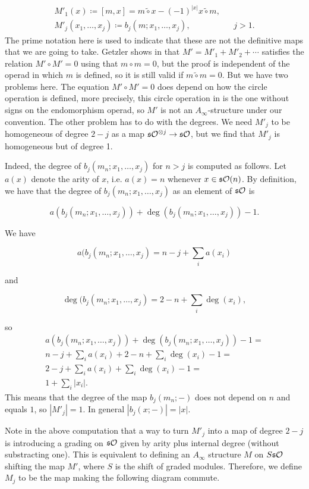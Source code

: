 \documentclass[twoside]{article}
\begin{document}
\begin{align*}
M'_1(x)\coloneqq [m,x]=m\tilde{\circ} x-(-1)^{|x|}x\tilde{\circ}m, & &  \\
M'_j(x_1,\dots, x_j)\coloneqq b_j(m;x_1,\dots, x_j),& &j>1.
\end{align*}
The prime notation here is used to indicate that these are not the definitive maps that we are going to take. Getzler shows in \cite{getzler} that $M'=M'_1+M'_2+\cdots$ satisfies the relation $M'\circ M'=0$ using that $m\circ m=0$, but the proof is independent of the operad in which $m$ is defined, so it is still valid if $m\tilde{\circ}m=0$. But we have two problems here. The equation $M'\circ M'=0$ does depend on how the circle operation is defined, more precisely, this circle operation in \cite{getzler} is the one without signs on the endomorphism operad, so $M'$ is not an $A_\infty$-structure under our convention. The other problem has to do with the degrees. We need $M'_j$ to be homogeneous of degree $2-j$ as a map $\mathfrak{s}{\mathcal O}^{\otimes j}\to \mathfrak{s}{\mathcal O}$, but we find that $M'_j$ is homogeneous but of degree 1. 

Indeed, the degree of $b_j(m_n;x_1,\dots,x_j)$ for $n>j$ is computed as follows. Let $a(x)$ denote the arity of $x$, i.e. $a(x)=n$ whenever $x\in\mathfrak{s}{\mathcal O}(n)$. By definition, we have that the degree of $b_j(m_n;x_1,\dots,x_j)$ as an element of $\mathfrak{s}{\mathcal O}$ is

\[a(b_j(m_n;x_1,\dots,x_j))+\deg(b_j(m_n;x_1,\dots,x_j))-1.\]

We have 

\[a(b_j(m_n;x_1,\dots,x_j)=n-j+\sum_i a(x_i)\]

and 

\[\deg(b_j(m_n;x_1,\dots,x_j)=2-n+\sum_i\deg(x_i),\]

so 
\begin{align*}
a(b_j(m_n;x_1,\dots,x_j))+\deg(b_j(m_n;x_1,\dots,x_j))-1=\\
n-j+\sum_i a(x_i)+2-n+\sum_i\deg(x_i)-1=\\
2-j+\sum_i a(x_i)+\sum_i\deg(x_i)-1=\\
1+\sum_i|x_i|.
\end{align*}
This means that the degree of the map $b_j(m_n;-)$ does not depend on $n$ and equals $1$, so $|M'_j|=1$. In general $|b_j(x;-)|=|x|$. %

Note in the above computation that a way to turn $M'_j$ into a map of degree $2-j$ is introducing a grading on $\mathfrak{s}{\mathcal O}$ given by arity plus internal degree (without substracting one). This is equivalent to defining an $A_\infty$ structure $M$ on $S\mathfrak{s}{\mathcal O}$ shifting the map $M'$, where $S$ is the shift of graded modules. Therefore, we define $M_j$ to be the map making the following diagram commute.
\end{document}
